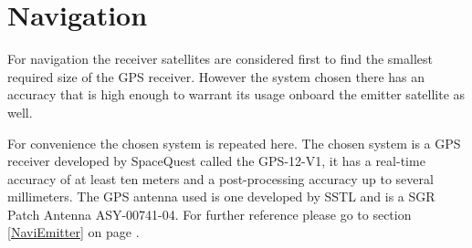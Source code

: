 \section{Navigation}
\label{NaviReceiver}

For navigation the receiver satellites are considered first to find the smallest required size of the \acs{GPS} receiver. However the system chosen there has an accuracy that is high enough to warrant its usage onboard the emitter satellite as well.

For convenience the chosen system is repeated here. The chosen system is a \acs{GPS} receiver developed by SpaceQuest called the GPS-12-V1, it has a real-time accuracy of at least ten meters and a post-processing accuracy up to several millimeters. The \acs{GPS} antenna used is one developed by \ac{SSTL} and is a SGR Patch Antenna ASY-00741-04. For further reference please go to section \ref{NaviEmitter} on page \pageref{NaviEmitter}.
